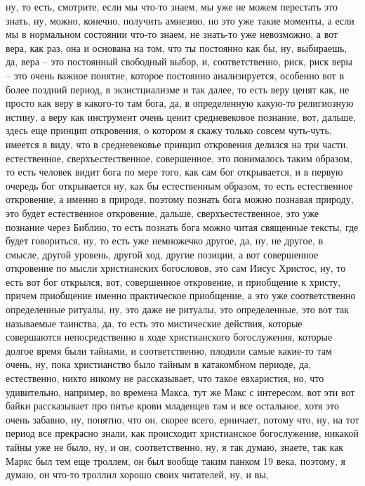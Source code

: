 ну, то есть, смотрите, если мы что-то знаем, мы уже не можем перестать это
знать, ну, можно, конечно, получить амнезию, но это уже такие моменты, а если мы
в нормальном состоянии что-то знаем, не знать-то уже невозможно, а вот вера, как
раз, она и основана на том, что ты постоянно как бы, ну, выбираешь, да, вера –
это постоянный свободный выбор, и, соответственно, риск, риск веры – это очень
важное понятие, которое постоянно анализируется, особенно вот в более поздний
период, в экзистциализме и так далее, то есть веру ценят как, не просто как веру
в какого-то там бога, да, в определенную какую-то религиозную истину, а веру как
инструмент очень ценит средневековое познание, вот, дальше, здесь еще принцип
откровения, о котором я скажу только совсем чуть-чуть, имеется в виду, что в
средневековье принцип откровения делился на три части, естественное,
сверхъестественное, совершенное, это понималось таким образом, то есть человек
видит бога по мере того, как сам бог открывается, и в первую очередь бог
открывается ну, как бы естественным образом, то есть естественное откровение, а
именно в природе, поэтому познать бога можно познавая природу, это будет
естественное откровение, дальше, сверхъестественное, это уже познание через
Библию, то есть познать бога можно читая священные тексты, где будет говориться,
ну, то есть уже немножечко другое, да, ну, не другое, в смысле, другой уровень,
другой ход, другие позиции, а вот совершенное откровение по мысли христианских
богословов, это сам Иисус Христос, ну, то есть вот бог открылся, вот,
совершенное откровение, и приобщение к христу, причем приобщение именно
практическое приобщение, а это уже соответственно определенные ритуалы, ну, это
даже не ритуалы, это определенные, это вот так называемые таинства, да, то есть
это мистические действия, которые совершаются непосредственно в ходе
христианского богослужения, которые долгое время были тайнами, и соответственно,
плодили самые какие-то там очень, ну, пока христианство было тайным в
катакомбном периоде, да, естественно, никто никому не рассказывает, что такое
евхаристия, но, что удивительно, например, во времена Макса, тут же Макс с
интересом, вот эти вот байки рассказывает про питье крови младенцев там и все
остальное, хотя это очень забавно, ну, понятно, что он, скорее всего, ерничает,
потому что, ну, на тот период все прекрасно знали, как происходит христианское
богослужение, никакой тайны уже не было, ну, и он, соответственно, ну, я так
думаю, знаете, так как Маркс был тем еще троллем, он был вообще таким панком 19
века, поэтому, я думаю, он что-то троллил хорошо своих читателей, ну, и вы,
